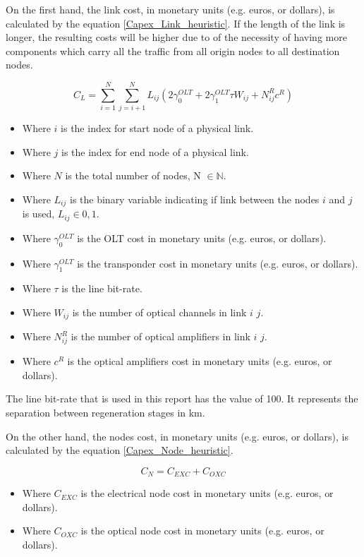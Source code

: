 On the first hand, the link cost, in monetary units (e.g. euros, or dollars), is calculated by the equation \ref{Capex_Link_heuristic}. If the length of the link is longer, the resulting costs will be higher due to of the necessity of having more components which carry all the traffic from all origin nodes to all destination nodes.

\begin{equation}
C_L = \sum_{i=1}^N \sum_{j=i+1}^N L_{ij} \left( 2 \gamma_0^{OLT} + 2 \gamma_1^{OLT} \tau W_{ij} + N^R_{ij} c^R \right)
\label{Capex_Link_heuristic}
\end{equation}

\begin{itemize}
\item Where {$i$ is the index for start node of a physical link}.
\item Where {$j$ is the index for end node of a physical link}.
\item Where {$N$ is the total number of nodes, N $\in \mathbb{N}$}.
\item Where {$L_{ij}$ is the binary variable indicating if link between the nodes $i$ and $j$ is used, $L_{ij} \in {0, 1}$}.
\item Where {$\gamma_0^{OLT}$ is the OLT cost in monetary units (e.g. euros, or dollars)}.
\item Where {$\gamma_1^{OLT}$ is the transponder cost in monetary units (e.g. euros, or dollars)}.
\item Where {$\tau$ is the line bit-rate}.
\item Where {$W_{ij}$ is the number of optical channels in link $i$ $j$}.
\item Where {$N^R_{ij}$ is the number of optical amplifiers in link $i$ $j$}.
\item Where {$c^R$ is the optical amplifiers cost in monetary units (e.g. euros, or dollars)}.
\end{itemize}

The line bit-rate that is used in this report has the value of 100. It represents the separation between regeneration stages in km.

On the other hand, the nodes cost, in monetary units (e.g. euros, or dollars), is calculated by the equation \ref{Capex_Node_heuristic}.

\begin{equation}
C_N = C_{EXC} + C_{OXC}
\label{Capex_Node_heuristic}
\end{equation}

\begin{itemize}
\item Where {$C_{EXC}$ is the electrical node cost in monetary units (e.g. euros, or dollars)}.
\item Where {$C_{OXC}$ is the optical node cost in monetary units (e.g. euros, or dollars)}.
\end{itemize}


